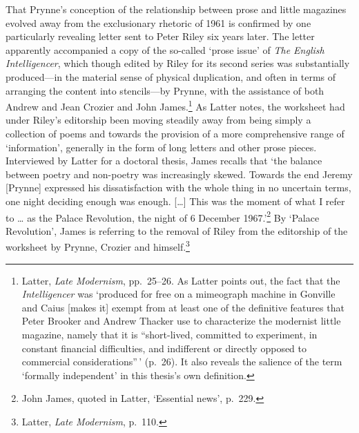 \documentclass[]{article}
\begin{document}
That Prynne's conception of the relationship between prose and little
magazines evolved away from the exclusionary rhetoric of 1961 is
confirmed by one particularly revealing letter sent to Peter Riley six
years later. The letter apparently accompanied a copy of the so-called
`prose issue' of \emph{The English Intelligencer}, which though edited
by Riley for its second series was substantially produced---in the
material sense of physical duplication, and often in terms of arranging
the content into stencils---by Prynne, with the assistance of both
Andrew and Jean Crozier and John James.\footnote{Latter, \emph{Late
  Modernism}, pp.~25--26. As Latter points out, the fact that the
  \emph{Intelligencer} was `produced for free on a mimeograph machine in
  Gonville and Caius {[}makes it{]} exempt from at least one of the
  definitive features that Peter Brooker and Andrew Thacker use to
  characterize the modernist little magazine, namely that it is
  ``short-lived, committed to experiment, in constant financial
  difficulties, and indifferent or directly opposed to commercial
  considerations''\,' (p.~26). It also reveals the salience of the term
  `formally independent' in this thesis's own definition.} As Latter
notes, the worksheet had under Riley's editorship been moving steadily
away from being simply a collection of poems and towards the provision
of a more comprehensive range of `information', generally in the form of
long letters and other prose pieces. Interviewed by Latter for a
doctoral thesis, James recalls that `the balance between poetry and
non-poetry was increasingly skewed. Towards the end Jeremy {[}Prynne{]}
expressed his dissatisfaction with the whole thing in no uncertain
terms, one night deciding enough was enough. {[}\ldots{}{]} This was the
moment of what I refer to \ldots{} as the Palace Revolution, the night
of 6 December 1967.'\footnote{John James, quoted in Latter, `Essential
  news', p.~229.} By `Palace Revolution', James is referring to the
removal of Riley from the editorship of the worksheet by Prynne, Crozier
and himself.\footnote{Latter, \emph{Late Modernism}, p.~110.}
\end{document}
